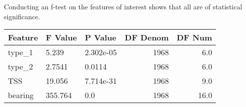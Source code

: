 \documentclass[twoside,symmetric,notoc]{tufte-book}
\begin{document}
\par{%
Conducting an f-test on the features of interest shows that all are of statistical significance.
\begin{tabular}{lllrr}                                                                             
\toprule                                                                                            
 Feature &                 F Value &                 P Value &  DF Denom &  DF Num \\          
\midrule                                                                                            
   type\_1 & 5.239 &  2.302e-05 &      1968 &     6.0 \\          
   type\_2 &    2.7541 &    0.0114 &      1968 &     6.0 \\          
    TSS &  19.056 &   7.714e-31 &      1968 &     9.0 \\           
  bearing &   355.764 &                     0.0 &      1968 &    16.0 \\           
\bottomrule                                                                              
\end{tabular}                                       
}
\vspace{0.1in}
\end{document}
